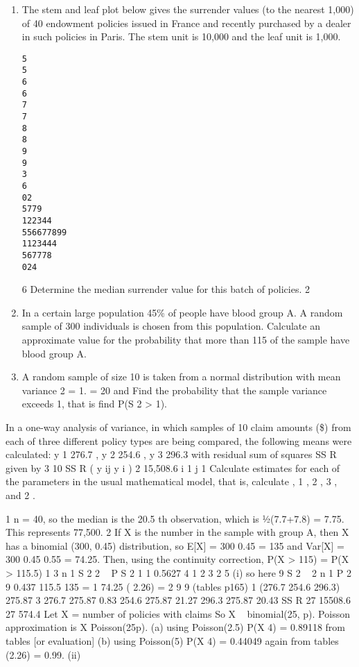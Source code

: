 \documentclass[a4paper,12pt]{article}
\begin{document}
\begin{enumerate}

\item %
The stem and leaf plot below gives the surrender values (to the nearest 1,000) of 40
endowment policies issued in France and recently purchased by a dealer in such
policies in Paris. The stem unit is 10,000 and the leaf unit is 1,000.
\begin{verbatim}
5
5
6
6
7
7
8
8
9
9
3
6
02
5779
122344
556677899
1123444
567778
024
\end{verbatim}

6
Determine the median surrender value for this batch of policies.
2
\item In a certain large population 45\% of people have blood group A. A random sample of 300 individuals is chosen from this population.
Calculate an approximate value for the probability that more than 115 of the sample have blood group A.


\item
A random sample of size 10 is taken from a normal distribution with mean variance 2 = 1.
= 20 and
Find the probability that the sample variance exceeds 1, that is find P(S 2 > 1).

\end{enumerate}

In a one-way analysis of variance, in which samples of 10 claim amounts (\$) from each of three different policy types are being compared, the following means were
calculated:
y 1
276.7 ,
y 2
254.6 ,
y 3
296.3
with residual sum of squares SS R given by
3 10
SS R
( y ij
y i ) 2 15,508.6
i 1 j 1
Calculate estimates for each of the parameters in the usual mathematical model, that
is, calculate , 1 , 2 , 3 , and 2 .


\newpage
1 n = 40, so the median is the 20.5 th observation, which is 1⁄2(7.7+7.8) = 7.75.
This represents 77,500.
2 If X is the number in the sample with group A, then X has a binomial (300, 0.45)
distribution, so
E[X] = 300
0.45 = 135 and Var[X] = 300
0.45
0.55 = 74.25.
Then, using the continuity correction,
P(X > 115) = P(X > 115.5) 1
3
n 1 S 2
2
~
P S 2 1
1 0.5627
4
1
2
3
2
5
(i)
so here 9 S 2 ~
2
n 1
P
2
9
0.437
115.5 135
= 1
74.25
( 2.26) =
2
9
9
(tables p165)
1
(276.7 254.6 296.3) 275.87
3
276.7 275.87 0.83
254.6 275.87
21.27
296.3 275.87 20.43
SS R
27
15508.6
27
574.4
Let X = number of policies with claims
So X ~ binomial(25, p).
Poisson approximation is X Poisson(25p).
(a) using Poisson(2.5)
P(X 4) = 0.89118 from tables [or evaluation]
(b) using Poisson(5)
P(X 4) = 0.44049 again from tables
(2.26) = 0.99.%
(ii)
\end{document}
